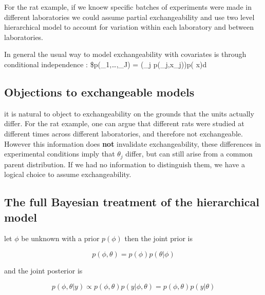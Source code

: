\documentclass[
]{book}
\theoremstyle{definition}
\theoremstyle{definition}
\theoremstyle{definition}
\theoremstyle{definition}
\theoremstyle{remark}
\begin{document}
For the rat example, if we knoew specific batches of experiments were made in different laboratories we could assume partial exchangeability and use two level hierarchical model to account for variation within each laboratory and between laboratories.

In general the usual way to model exchangeability with covariates is through conditional independence : \$p(\theta\_1,\ldots,\theta\_J) = (\int \prod\_j p(\theta\_j\textbar{}\phi,x\_j))p(\phi\textbar{} x)d\phi

\hypertarget{objections-to-exchangeable-models}{%
\subsection*{Objections to exchangeable models}\label{objections-to-exchangeable-models}}

it is natural to object to exchangeability on the grounds that the units actually differ. For the rat example, one can argue that different rats were studied at different times across different laboratories, and therefore not exchangeable. However this information does \textbf{not} invalidate exchangeability, these differences in experimental conditions imply that \(\theta_j\) differ, but can still arise from a common parent distribution. If we had no information to distinguish them, we have a logical choice to assume exchangeability.

\hypertarget{the-full-bayesian-treatment-of-the-hierarchical-model}{%
\subsection*{The full Bayesian treatment of the hierarchical model}\label{the-full-bayesian-treatment-of-the-hierarchical-model}}

let \(\phi\) be unknown with a prior \(p(\phi)\) then the joint prior is

\begin{equation}
p(\phi,\theta) = p(\phi)p(\theta| \phi)
\end{equation}

and the joint posterior is

\begin{equation}
p(\phi,\theta | y) \propto p(\phi,\theta)p(y| \phi, \theta) = p(\phi,\theta)p(y|\theta)
\end{equation}
\end{document}
